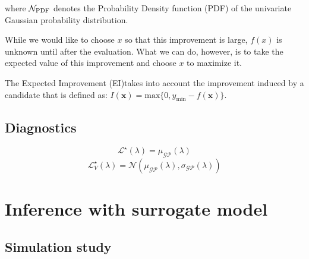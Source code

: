 \documentclass[twocolumn]{aastex631}
\begin{document}
where $\mathcal{N}_{\rm PDF}$ denotes the Probability Density function (PDF) of the univariate Gaussian probability distribution.

While we would like to choose $x$ so that this improvement is large, $f(x)$ is unknown until after the evaluation.  What we can do, however,
is to take the expected value of this improvement and choose $x$ to maximize it.

The Expected Improvement (EI)takes into account the improvement induced by a candidate that is defined as: $I(\textbf{x})=\text{max}\{0,y_{\text{min}}-f(\textbf{x})\}$.












\subsection{Diagnostics}

\begin{equation}
    \mathcal{L}^{\star}(\lambda) = \mu_{\mathcal{GP}}(\lambda)
\end{equation}
\begin{equation}
    \mathcal{L}^{\star}_{V}(\lambda) = \mathcal{N}(\mu_{\mathcal{GP}}(\lambda), \sigma_{\mathcal{GP}}(\lambda))
\end{equation}



\section{Inference with surrogate model}

\subsection{Simulation study}
\end{document}
